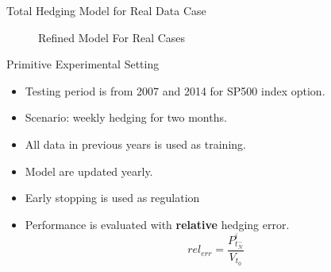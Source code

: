 \documentclass[10pt,table,mathserif]{beamer}
\newcommand{\vx}{\mathbf{x}}
\newcommand{\vy}{\mathbf{y}}
\begin{document}
\begin{frame}[fragile]{Total Hedging Model for Real Data Case}
\begin{figure}[htp!]
{
	}
	\caption{Refined Model For Real Cases}
	\label{fig:RNNModel}
\end{figure}
\end{frame}

\begin{frame}{Primitive Experimental Setting}
\begin{itemize}
	\item Testing period is from 2007 and 2014 for SP500 index option.
	\item Scenario: weekly hedging for two months.
	\item All data in previous years is used as training.
	\item Model are updated yearly.
	\item Early stopping is used as regulation
	\item Performance is evaluated with \textbf{relative} hedging error.
	\[ 
	rel_{err}=\frac{P^i_{t_N^-}}{V_{t_0}}
	\]
\end{itemize}
\end{frame}
\end{document}
